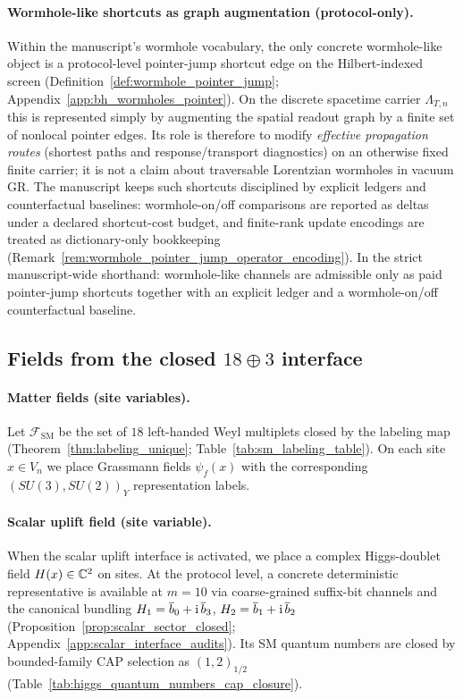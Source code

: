 \paragraph{Wormhole-like shortcuts as graph augmentation (protocol-only).}
\InterfaceTag Within the manuscript's wormhole vocabulary, the only concrete wormhole-like object is a protocol-level pointer-jump shortcut edge on the Hilbert-indexed screen (Definition~\ref{def:wormhole_pointer_jump}; Appendix~\ref{app:bh_wormholes_pointer}).
On the discrete spacetime carrier $\Lambda_{T,n}$ this is represented simply by augmenting the spatial readout graph by a finite set of nonlocal pointer edges.
Its role is therefore to modify \emph{effective propagation routes} (shortest paths and response/transport diagnostics) on an otherwise fixed finite carrier; it is not a claim about traversable Lorentzian wormholes in vacuum GR.
\AuditTag The manuscript keeps such shortcuts disciplined by explicit ledgers and counterfactual baselines: wormhole-on/off comparisons are reported as deltas under a declared shortcut-cost budget, and finite-rank update encodings are treated as dictionary-only bookkeeping (Remark~\ref{rem:wormhole_pointer_jump_operator_encoding}).
\AuditTag In the strict manuscript-wide shorthand: wormhole-like channels are admissible only as paid pointer-jump shortcuts together with an explicit ledger and a wormhole-on/off counterfactual baseline.

\subsection{Fields from the closed \texorpdfstring{$18\oplus 3$}{18+3} interface}

\paragraph{Matter fields (site variables).}
\InterfaceTag Let $\mathcal{F}_{\mathrm{SM}}$ be the set of $18$ left-handed Weyl multiplets closed by the labeling map (Theorem~\ref{thm:labeling_unique}; Table~\ref{tab:sm_labeling_table}).
On each site $x\in V_n$ we place Grassmann fields $\psi_f(x)$ with the corresponding $(SU(3),SU(2))_Y$ representation labels.

\paragraph{Scalar uplift field (site variable).}
\InterfaceTag When the scalar uplift interface is activated, we place a complex Higgs-doublet field $H(x)\in\mathbb{C}^2$ on sites.
At the protocol level, a concrete deterministic representative is available at $m=10$ via coarse-grained suffix-bit channels and the canonical bundling
$H_1=\overline b_0+\mathrm{i}\,\overline b_3$, $H_2=\overline b_1+\mathrm{i}\,\overline b_2$
(Proposition~\ref{prop:scalar_sector_closed}; Appendix~\ref{app:scalar_interface_audits}).
Its SM quantum numbers are closed by bounded-family CAP selection as $(1,2)_{1/2}$ (Table~\ref{tab:higgs_quantum_numbers_cap_closure}).

